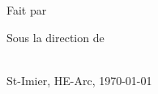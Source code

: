 \begin{titlepage}
\begin{flushright}
		\vspace{1cm}
		\begin{spacing}{2.0}	
			Fait par\\
			{\huge \myauthor}
		\end{spacing}
	
		
		\vspace{1cm}
		\begin{spacing}{1.5}
			Sous la direction de\\
			{\Large \mysupervisora }\\ 
		\end{spacing}
	
		{\Large \myfaculty}

		
		\vspace{1cm}%
		{\large St-Imier, HE-Arc, \today}
	\end{flushright}
\end{titlepage}
\cleardoublepage